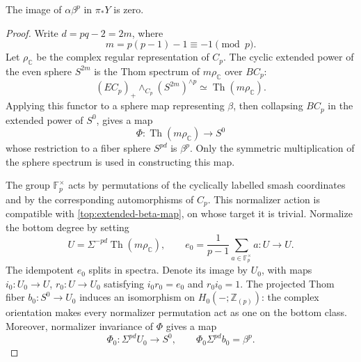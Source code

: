 \begin{proposition}
\label{top:extended-power-relation}
The image of $\alpha\beta^p$ in $\pi_*Y$ is zero.
\end{proposition}

\begin{proof}
Write $d=pq-2=2m$, where
\[
 m=p(p-1)-1\equiv-1\pmod p.
\]
Let $\rho_{\mathbb C}$ be the complex regular representation of
$C_p$. The cyclic extended power of the even sphere $S^{2m}$ is
the Thom spectrum of $m\rho_{\mathbb C}$ over $BC_p$:
\[
 (EC_p)_+\wedge_{C_p}(S^{2m})^{\wedge p}
 \simeq\operatorname{Th}(m\rho_{\mathbb C}).
\]
Applying this functor to a sphere map representing $\beta$, then
collapsing $BC_p$ in the extended power of $S^0$, gives a map
\begin{equation}
\label{top:extended-beta-map}
 \Phi:\operatorname{Th}(m\rho_{\mathbb C})\longrightarrow S^0
\end{equation}
whose restriction to a fiber sphere $S^{pd}$ is $\beta^p$.
Only the symmetric multiplication of the sphere spectrum is used
in constructing this map.

The group $\mathbb F_p^\times$ acts by permutations of the
cyclically labelled smash coordinates and by the corresponding
automorphisms of $C_p$. This normalizer action is compatible with
\eqref{top:extended-beta-map}, on whose target it is trivial.
Normalize the bottom degree by setting
\[
 U=\Sigma^{-pd}\operatorname{Th}(m\rho_{\mathbb C}),\qquad
 e_0=\frac1{p-1}\sum_{a\in\mathbb F_p^\times}a:U\longrightarrow U.
\]
The idempotent $e_0$ splits in spectra. Denote its image by $U_0$,
with maps $i_0:U_0\to U$, $r_0:U\to U_0$ satisfying
$i_0r_0=e_0$ and $r_0i_0=1$.
The projected Thom fiber $b_0:S^0\to U_0$ induces an isomorphism
on $H_0(-;\mathbb Z_{(p)})$: the complex orientation makes every
normalizer permutation act as one on the bottom class.
Moreover, normalizer invariance of $\Phi$ gives a map
\[
 \Phi_0:\Sigma^{pd}U_0\longrightarrow S^0,
 \qquad \Phi_0\Sigma^{pd}b_0=\beta^p.
\]


\end{proof}

